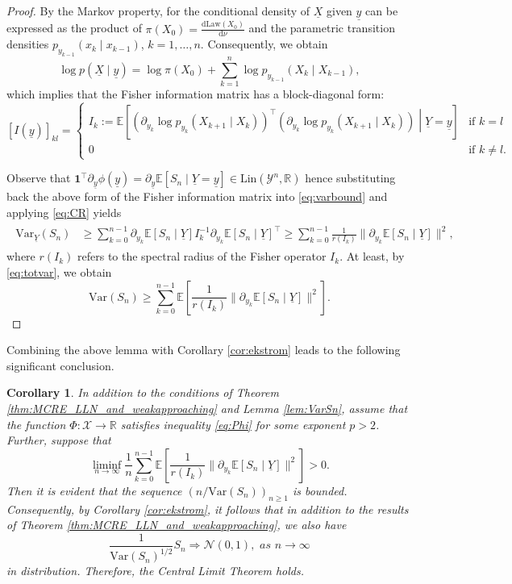 \documentclass[a4paper,10pt]{article}
\newtheorem{corollary}[theorem]{Corollary}
\newcommand{\R}{\mathbb{R}}
\newcommand{\X}{\mathcal{X}}
\newcommand{\Y}{\mathcal{Y}}
\newcommand{\E}{\mathbb{E}}
\newcommand{\law}[1]{\text{Law}(#1)}
\newcommand{\var}{\mathrm{Var}}
\newcommand{\lin}{\mathrm{Lin}}
\newcommand{\dint}{\mathrm{d}}  %
\newcommand{\ul}[1]{\underline{#1}}
\begin{document}
\begin{proof}
	By the Markov property, for the conditional density of $\ul{X}$ given $\ul{y}$
	can be expressed as the product of $\pi (X_0)=\frac{\dint\law{X_0}}{\dint\nu}$ and the parametric transition densities $ p_{y_{k-1}}(x_{k}\mid x_{k-1})$, $k=1,\ldots,n$. Consequently, we obtain 
	$$
	\log p(\ul{X}\mid \ul{y})=\log \pi (X_0)+\sum_{k=1}^{n} \log p_{y_{k-1}}(X_{k}\mid X_{k-1}),
	$$
	which implies that the Fisher information matrix has a block-diagonal form:
	$$
	[I(\ul{y})]_{kl}
	=
	\begin{cases} 
	I_k:=
	\E \left[\left(\partial_{y_k}\log p_{y_{k}}(X_{k+1}\mid X_{k})\right)^\top\left(\partial_{y_k}\log p_{y_{k}}(X_{k+1}\mid X_{k})\right)\middle| \ul{Y}=\ul{y}\right] & \text{if}\,\, k=l \\
	0 & \text{if}\,\, k\ne l.
	\end{cases}
	$$ 
	
	Observe that $\mathbf{1}^\top \partial_{\ul{y}}\phi (\ul{y})= \partial_{\ul{y}}\E \left[S_n\mid \ul{Y}=\ul{y}\right]\in \lin (\Y^n,\R)$ hence substituting back the above form of the Fisher information matrix into \eqref{eq:varbound}
	and applying \eqref{eq:CR}
	yields
	\begin{align*}\label{eq:varsum}
	\begin{split}
	\var_{\ul{Y}}(S_n)
	&\ge
	\sum_{k=0}^{n-1} \partial_{y_k}
	\E \left[S_n\mid \ul{Y}\right] 
	I_k^{-1}
	\partial_{y_k}\E \left[S_n\mid \ul{Y}\right]^\top
	\ge \sum_{k=0}^{n-1}\frac{1}{r (I_k)}\lVert 	\partial_{y_k}\E \left[S_n\mid \ul{Y}\right]\rVert^2,
	\end{split}
	\end{align*}
	where $r (I_k)$ refers to the spectral radius of the Fisher operator $I_k$. At least, by \eqref{eq:totvar}, we obtain
	\begin{equation}\label{eq:varsum2}
	\var (S_n) \ge \sum_{k=0}^{n-1} \E \left[\frac{1}{r (I_k)}\lVert\partial_{y_k}\E \left[S_n\mid \ul{Y}\right]\rVert^2\right].
	\end{equation}
	
\end{proof}

Combining the above lemma with Corollary \ref{cor:ekstrom} leads to the following significant conclusion.
\begin{corollary}\label{cor:ekstrom2}
In addition to the conditions of Theorem \ref{thm:MCRE_LLN_and_weakapproaching} and Lemma \ref{lem:VarSn}, assume that the function $\Phi:\X\to\R$ satisfies inequality \eqref{eq:Phi} for some exponent $p>2$. Further, suppose that
$$
\liminf_{n\to\infty}\frac{1}{n}\sum_{k=0}^{n-1}\E \left[\frac{1}{r (I_k)}\lVert\partial_{y_k}\E \left[S_n\mid \ul{Y}\right]\rVert^2\right]>0.
$$
Then it is evident that the sequence $\left(n/\var (S_n)\right)_{n\ge1}$ is bounded. Consequently, by Corollary \ref{cor:ekstrom}, it follows that in addition to the results of Theorem \ref{thm:MCRE_LLN_and_weakapproaching}, 
we also have
$$
\frac{1}{\var (S_n)^{1/2}}S_n\Longrightarrow\mathcal{N} (0,1),\,\, as\,\, n\to\infty
$$
in distribution. Therefore, the Central Limit Theorem holds.
\end{corollary}
\end{document}
